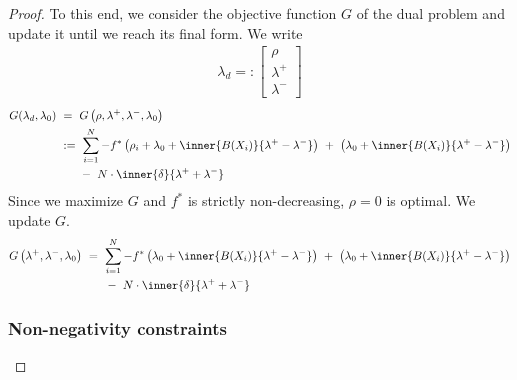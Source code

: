 \begin{proof}
To this end, we consider the objective function $G$ of the dual
problem and update it until we reach its final form.
We write
\begin{gather}
  \lambda_d
  =:
  \begin{bmatrix}
    \rho\\
    \lambda^+\\
    \lambda^-
  \end{bmatrix}
\end{gather}
\begin{align*}
G(\lambda_d,\lambda_0)
&
\ 
=
\ 
G
\left( 
\rho,
  \lambda^+,
  \lambda^-,
\lambda_0
\right)
\\
&
\ 
:=
\ 
    \sum_{i = 1}^{N} 
    -
    f^*
    \left( 
    \rho_i
    +
    \lambda_0
    +
    \inner{B(X_i)}
    {\lambda^+-\lambda^-}
    \right)
    \ 
    +
    \ 
    \left( 
    \lambda_0
    +
    \inner{B(X_i)}
    {\lambda^+-\lambda^-}
    \right)
\\
&
    \qquad 
    -
    \ 
    N
    \cdot
    \inner{\delta}
    {\lambda^++\lambda^-}
\end{align*}
Since we maximize $G$ and $f^*$ is strictly non-decreasing, 
$\rho=0$ is optimal. We update $G$.
\begin{align*}
G
\left( 
  \lambda^+,
  \lambda^-,
\lambda_0
\right)
&
\ 
=
\ 
    \sum_{i = 1}^{N} 
    -
    f^*
    \left( 
    \lambda_0
    +
    \inner{B(X_i)}
    {\lambda^+-\lambda^-}
    \right)
    \ 
    +
    \ 
    \left( 
    \lambda_0
    +
    \inner{B(X_i)}
    {\lambda^+-\lambda^-}
    \right)
\\
&
    \qquad 
    -
    \ 
    N
    \cdot
    \inner{\delta}
    {\lambda^++\lambda^-}
\end{align*}

\subsubsection*{Non-negativity constraints}


\end{proof}

